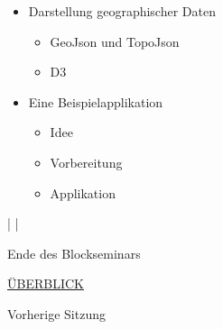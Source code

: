 \begin{itemize}
\itemsep1pt\parskip0pt
\item
  {Darstellung geographischer Daten}

  \begin{itemize}
  \itemsep1pt\parskip0pt
  \item
    {GeoJson und TopoJson}
  \item
    {D3}
  \end{itemize}
\item
  {Eine Beispielapplikation}

  \begin{itemize}
  \itemsep1pt\parskip0pt
  \item
    {Idee}
  \item
    {Vorbereitung}
  \item
    {Applikation}
  \end{itemize}
\end{itemize}

\VERB|\NormalTok{>>> } \NormalTok{- }|

Ende des Blockseminars

\href{../slides.html}{ÜBERBLICK}



Vorherige Sitzung
